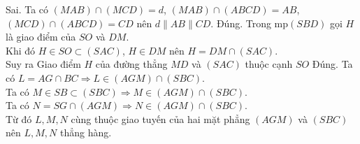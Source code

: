 \begin{ex}
{\begin{itemchoice}
   \itemch Sai. Ta có $(MAB)\cap(MCD)=d$,  $(MAB)\cap(ABCD)=AB$,\\$(MCD)\cap(ABCD)=CD$ nên $d\parallel AB\parallel CD$.
   \itemch Đúng. Trong mp$ (SBD)  $ gọi $H$ là giao điểm của $ SO $ và $ DM $. \\
   Khi đó $ H \in SO \subset (SAC)$, $H \in DM $ nên  $ H = DM \cap (SAC) $.\\
   Suy ra Giao điểm $ H $ của đường thẳng $ MD $ và  $ (SAC) $ thuộc cạnh $SO$
   \itemch Đúng. Ta  có $ L = AG \cap BC \Rightarrow L \in (AGM) \cap (SBC)$. \\
   Ta có $ M \in SB \subset (SBC) \Rightarrow M \in (AGM) \cap  (SBC)$. \\
   Ta có $ N =  SG \cap (AGM) \Rightarrow N \in (AGM) \cap (SBC)$. \\
   Từ đó $ L, M, N $ cùng thuộc giao tuyến của hai mặt phẳng $ (AGM) $ và $ (SBC)  $ nên $ L, M, N $ thẳng hàng.
  \end{itemchoice}
 } 
\end{ex}


